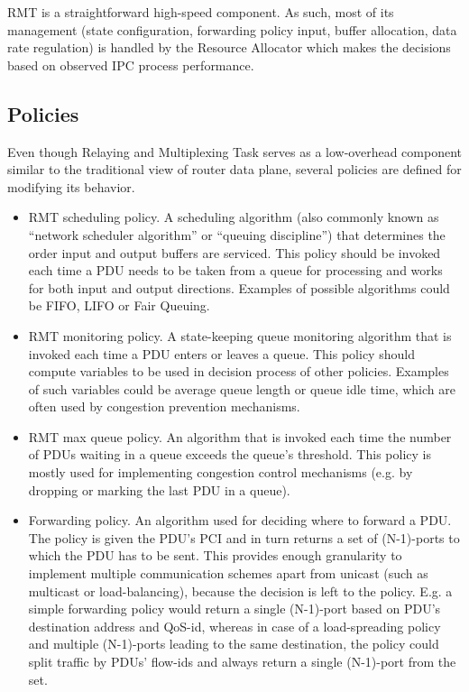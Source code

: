             RMT is a straightforward high-speed component. As such, most of its management (state configuration, forwarding policy input, buffer allocation, data rate regulation) is handled by the Resource Allocator which makes the decisions based on observed IPC process performance.


        \subsection{Policies}
            Even though Relaying and Multiplexing Task serves as a low-overhead component similar to the traditional view of router data plane, several policies are defined for modifying its behavior.

            \begin{itemize}
                \item RMT scheduling policy. A scheduling algorithm (also commonly known as ``network scheduler algorithm'' or ``queuing discipline'') that determines the order input and output buffers are serviced. This policy should be invoked each time a PDU needs to be taken from a queue for processing and works for both input and output directions. Examples of possible algorithms could be FIFO, LIFO or Fair Queuing.
                \item RMT monitoring policy. A state-keeping queue monitoring algorithm that is invoked each time a PDU enters or leaves a queue. This policy should compute variables to be used in decision process of other policies. Examples of such variables could be average queue length or queue idle time, which are often used by congestion prevention mechanisms.
                \item RMT max queue policy. An algorithm that is invoked each time the number of PDUs waiting in a queue exceeds the queue's threshold. This policy is mostly used for implementing congestion control mechanisms (e.g. by dropping or marking the last PDU in a queue).
                \item Forwarding policy. An algorithm used for deciding where to forward a PDU. The policy is given the PDU's PCI and in turn returns a set of (N-1)-ports to which the PDU has to be sent. This provides enough granularity to implement multiple communication schemes apart from unicast (such as multicast or load-balancing), because the decision is left to the policy. E.g. a simple forwarding policy would return a single (N-1)-port based on PDU's destination address and QoS-id, whereas in case of a load-spreading policy and multiple (N-1)-ports leading to the same destination, the policy could split traffic by PDUs' flow-ids and always return a single (N-1)-port from the set.
            \end{itemize}



